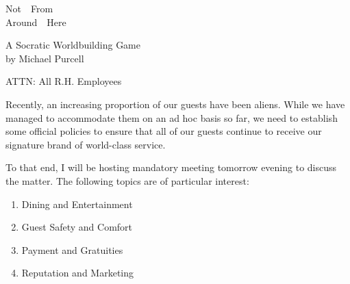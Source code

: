 \documentclass[a6paper, 11pt, parskip=half, DIV=15]{scrartcl}
\begin{document}
\begin{titlepage}
\enlargethispage{3.0\baselineskip}
\setmainfont[Scale=1.55]{Dakota Rough}
\Huge
\begin{center}
\vspace*{-0.5\baselineskip}
Not\ \ From\\[1ex]
Around\ \ Here

\vfill
{}
\vfill
\huge
\setmainfont{Caveat}
A Socratic Worldbuilding Game\\
by Michael Purcell
\end{center}
\end{titlepage}
\thispagestyle{empty}
\enlargethispage{1.75\baselineskip}
\setmainfont{Special Elite}
\normalsize
\noindent ATTN: All R.H. Employees

Recently, an increasing proportion of our guests have been aliens. While we have managed to accommodate them on an ad hoc basis so far, we need to establish some official policies to ensure that all of our guests continue to receive our signature brand of world-class service. 

To that end, I will be hosting mandatory meeting tomorrow evening to discuss the matter.
The following topics are of particular interest:
\begin{enumerate}[nosep]
	\item Dining and Entertainment
	\item Guest Safety and Comfort
	\item Payment and Gratuities
	\item Reputation and Marketing
\end{enumerate}   
\end{document}
